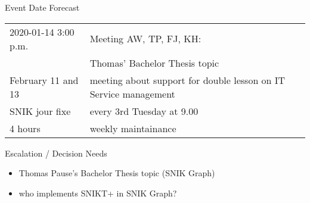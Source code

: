 \documentclass[]{kiesgrube}
\begin{document}
\begin{poster}
\begin{posterbox}[name=event,column=1,below=open]{Event Date Forecast}
\begin{tabulary}{\textwidth}{lL}
2020-01-14 3:00 p.m.	&Meeting AW, TP, FJ, KH:\\
			&Thomas' Bachelor Thesis topic\\

February 11 and 13&	meeting about support for double lesson on IT Service management\\
SNIK jour fixe	&every 3rd Tuesday at 9.00\\
4 hours		&weekly maintainance\\
\end{tabulary}
\end{posterbox}
\begin{posterbox}[name=escalation,column=1,below=event]{Escalation / Decision Needs}
\begin{itemize}
\item Thomas Pause's Bachelor Thesis topic (SNIK Graph)
\item who implements SNIKT+ in SNIK Graph?
\end{itemize}
\end{posterbox}
\end{poster}
\end{document}
